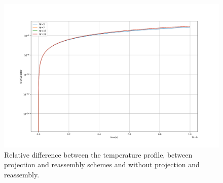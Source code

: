 \documentclass{article}
\begin{document}
\begin{figure}[H]
	\centering
	\includegraphics[width=1.0\textwidth]{fig/g0_proj_no_proj_temp.png}
	\caption{Relative difference between the temperature profile, between projection and reassembly schemes and without projection and reassembly.\label{fig:proj_no_proj}}
\end{figure}

\end{document}
